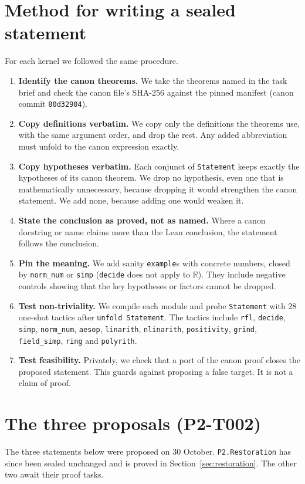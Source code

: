 \documentclass[11pt]{article}
\theoremstyle{definition}
\theoremstyle{remark}
\begin{document}
\section{Method for writing a sealed statement}
For each kernel we followed the same procedure.
\begin{enumerate}
\item \textbf{Identify the canon theorems.} We take the theorems named in the task brief and check the canon file's SHA-256
against the pinned manifest (canon commit \texttt{80d32904}).
\item \textbf{Copy definitions verbatim.} We copy only the definitions the theorems use, with the same argument order,
and drop the rest. Any added abbreviation must unfold to the canon expression exactly.
\item \textbf{Copy hypotheses verbatim.} Each conjunct of \texttt{Statement} keeps exactly the hypotheses of its canon theorem.
We drop no hypothesis, even one that is mathematically unnecessary, because dropping it would strengthen the canon statement.
We add none, because adding one would weaken it.
\item \textbf{State the conclusion as proved, not as named.} Where a canon docstring or name claims more than the Lean
conclusion, the statement follows the conclusion.
\item \textbf{Pin the meaning.} We add sanity \texttt{example}s with concrete numbers, closed by \texttt{norm\_num} or \texttt{simp}
(\texttt{decide} does not apply to $\mathbb{R}$). They include negative controls showing that the key hypotheses or factors cannot be dropped.
\item \textbf{Test non-triviality.} We compile each module and probe \texttt{Statement} with 28 one-shot tactics
after \texttt{unfold Statement}. The tactics include \texttt{rfl}, \texttt{decide}, \texttt{simp}, \texttt{norm\_num}, \texttt{aesop},
\texttt{linarith}, \texttt{nlinarith}, \texttt{positivity}, \texttt{grind}, \texttt{field\_simp}, \texttt{ring} and \texttt{polyrith}.
\item \textbf{Test feasibility.} Privately, we check that a port of the canon proof closes the proposed statement.
This guards against proposing a false target. It is not a claim of proof.
\end{enumerate}

\section{The three proposals (P2-T002)}\label{sec:proposals}
The three statements below were proposed on 30 October. \texttt{P2.Restoration} has since been sealed unchanged and is proved in
Section~\ref{sec:restoration}. The other two await their proof tasks.
\end{document}
